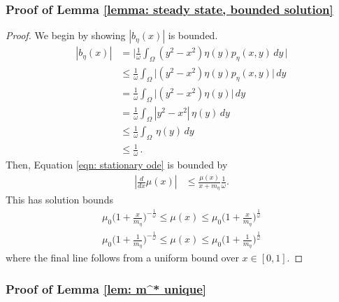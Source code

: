 \documentclass[10pt]{article}
\begin{document}
\subsubsection*{Proof of Lemma \ref{lemma: steady state, bounded solution}}
\begin{proof}
We begin by showing $|b_\eta(x)|$ is bounded.
\begin{align*}
    |b_\eta(x)| &= \bigg| \frac{1}{\omega}\int_{\Omega}(y^2-x^2)\eta(y)p_{\eta}(x,y)\, dy \,\bigg| \\
    &\leq \frac{1}{\omega}\int_{\Omega} \Big| (y^2-x^2)\eta(y)p_{\eta}(x,y)\Big|\, dy \, \\
    &= \frac{1}{\omega}\int_{\Omega} \Big| (y^2-x^2)\eta(y)\Big|\, dy \, \\
    &= \frac{1}{\omega}\int_{\Omega} | y^2-x^2 |\,\eta(y)\, dy \, \\
    &\leq \frac{1}{\omega}\int_{\Omega} \,\eta(y)\, dy \, \\
    &\leq \frac{1}{\omega}\,. 
\end{align*}
Then,  Equation \eqref{eqn: stationary ode} is bounded by
\begin{align}
    |\frac{d}{dx}\mu(x)| &\leq \frac{\mu(x)}{x+m_\eta}\frac{1}{\omega}.
\end{align}
This has solution bounds
\begin{align*}
    \mu_0 \bigg(1+\frac{x}{m_\eta}\bigg)^{-\frac{1}{\omega}} \leq \mu(x) \leq \mu_0\bigg(1+\frac{x}{m_\eta}\bigg)^{\frac{1}{\omega}}\\ 
    \mu_0 \bigg(1+\frac{1}{m_\eta}\bigg)^{-\frac{1}{\omega}} \leq \mu(x) \leq \mu_0\bigg(1+\frac{1}{m_\eta}\bigg)^{\frac{1}{\omega}}
\end{align*}
where the final line follows from a uniform bound over $x\in[0,1]$.
\end{proof}

\subsubsection*{Proof of Lemma \ref{lem: m^* unique}}
\end{document}
